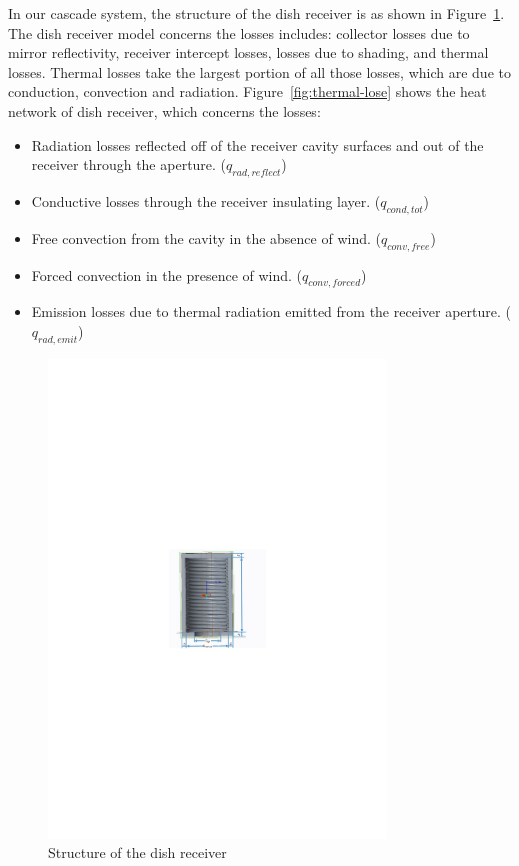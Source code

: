 \documentclass{article}
\begin{document}
In our cascade system, the structure of the dish receiver is as shown in Figure~\ref{fig:dishReceiver}. The dish receiver model concerns the losses includes: collector losses due to mirror reflectivity, receiver intercept losses, losses due to shading, and thermal losses. Thermal losses take the largest portion of all those losses, which are due to conduction, convection and radiation. Figure~\ref{fig:thermal-lose} shows the heat network of dish receiver, which concerns the losses:
\begin{itemize}
	\item Radiation losses reflected off of the receiver cavity surfaces and out of the receiver through the aperture. ($q_{rad,reflect}$)
	\item Conductive losses through the receiver insulating layer. ($q_{cond,tot}$)
	\item Free convection from the cavity in the absence of wind. ($q_{conv,free}$)
	\item Forced convection in the presence of wind. ($q_{conv,forced}$)
	\item Emission losses due to thermal radiation emitted from the receiver aperture. ($q_{rad,emit}$)
\end{itemize}

\noindent \begin{figure}[htbp]
\begin{center}
	\includegraphics[width = 0.8\textwidth]{graphics/dishReceiver}
	\caption{Structure of the dish receiver}
	\label{fig:dishReceiver}
\end{center}
\end{figure}
\end{document}
